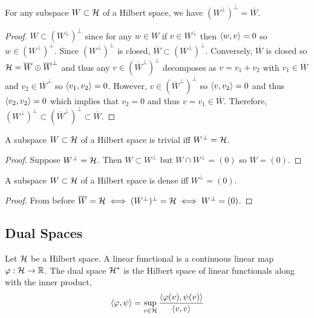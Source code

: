 \documentclass[12pt]{article}
\begin{document}
\begin{prop}
For any subspace $W \subset \mathcal{H}$ of a Hilbert space, we have $(W^\perp)^\perp = \overline{W}$.
\end{prop}

\begin{proof}
$W \subset (W^\perp)^\perp$ since for any $w \in W$ if $v \in W^\perp$ then $\left< w , v \right> = 0$ so $w \in (W^\perp)^\perp$. Since $(W^\perp)^\perp$ is closed, $\overline{W} \subset (W^\perp)^\perp$. Conversely, $\overline{W}$ is closed so $\mathcal{H} = \overline{W} \oplus \overline{W}^\perp$ and thus any $v \in (\overline{W}^\perp)^\perp$ decomposes as $v = v_1 + v_2$ with $v_1 \in \overline{W}$ and $v_2 \in \overline{W}^\perp$ so $\left< v_1 , v_2 \right> = 0$. However, $v \in (\overline{W}^\perp)^\perp$ so $\left< v , v_2 \right> = 0$ and thus $\left< v_2 , v_2 \right> = 0$ which implies that $v_2 = 0$ and thus $v = v_1 \in \overline{W}$. Therefore, $(W^\perp)^\perp \subset (\overline{W}^\perp)^\perp \subset \overline{W}$.
\end{proof}

\begin{cor}
A subspace $W \subset \mathcal{H}$ of a Hilbert space is trivial iff $W^\perp = \mathcal{H}$.
\end{cor}

\begin{proof}
Suppose $W^\perp = \mathcal{H}$. Then $W \subset W^\perp$ but $W \cap W^\perp = (0)$ so $W = (0)$.
\end{proof}

\begin{cor}
A subspace $W \subset \mathcal{H}$ of a Hilbert space is dense iff $W^\perp = (0)$.
\end{cor}

\begin{proof}
From before $\overline{W} = \mathcal{H} \iff (W^\perp)^\perp = \mathcal{H} \iff W^\perp = (0)$.
\end{proof}

\subsection{Dual Spaces}

\begin{defn}
Let $\mathcal{H}$ be a Hilbert space. A linear functional is a continuous linear map $\varphi : \mathcal{H} \to \mathbb{R}$. The dual space $\mathcal{H}^*$ is the Hilbert space of linear functionals along with the inner product,
\[ \left< \varphi , \psi \right> = \sup_{v \in \mathcal{H}} \frac{\left< \varphi(v) , \psi(v) \right>}{\left< v , v \right>} \]
\end{defn}
\end{document}
